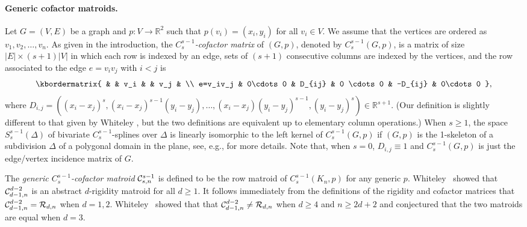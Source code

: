 \documentclass{daj}
\newcommand{\R}{\mathbb{R}}
\begin{document}
\paragraph{Generic cofactor matroids.}%
Let $G=(V,E)$ be a graph and $p:V\to \R^2$ such that $p(v_i)=(x_i,y_i)$ for all $v_i\in V$.
We assume that  the vertices are ordered as $v_1,v_2,\ldots,v_n$.
As given in the introduction,
the {\em $C^{s-1}_s$-cofactor matrix} of $(G,p)$, denoted by $C_s^{s-1}(G,p)$, is a matrix of size
$|E|\times (s+1)|V|$  in which each row is indexed by an edge, sets of $(s+1)$ consecutive columns are indexed by the vertices,
and the row associated to the  edge $e=v_iv_j$ with $i<j$ is
\[
\kbordermatrix{
 & & v_i & & v_j & \\
 e=v_iv_j & 0\cdots 0 & D_{ij} & 0 \cdots 0 & -D_{ij} & 0\cdots 0
},
\]
where  $D_{i,j}=((x_i-x_j)^s, (x_i-x_j)^{s-1}(y_i-y_j),\dots, (x_i-x_j)(y_i-y_j)^{s-1}, (y_i-y_j)^s)\in \mathbb{R}^{s+1}$.
(Our definition is slightly different to that given by Whiteley \cite{Wsurvey}, but the two definitions are equivalent up to elementary column operations.)
When $s\geq 1$, the space $S_s^{s-1}(\Delta)$ of bivariate $C_s^{s-1}$-splines over $\Delta$ is linearly isomorphic to the left kernel of  $C_s^{s-1}(G,p)$ if $(G,p)$ is the 1-skeleton of a subdivision $\Delta$ of a polygonal domain in the plane,
see, e.g., \cite{Wsurvey} for more details. Note that, when $s=0$, $D_{i,j}\equiv 1$ and $C_s^{s-1}(G,p)$ is just the edge/vertex incidence matrix of $G$. 

The {\em generic $C_s^{s-1}$-cofactor matroid} ${\cal C}_{s,n}^{s-1}$ is defined to be the row matroid of $C_s^{s-1}(K_n,p)$ for any generic $p$. Whiteley~\cite{Wsurvey} showed that  ${\cal C}_{d-1,n}^{d-2}$ is an abstract $d$-rigidity matroid for all $d\geq 1$. It follows immediately from the definitions of the rigidity and cofactor matrices  that ${\cal C}_{d-1,n}^{d-2}={\cal R}_{d,n}$ when $d=1,2$.  Whiteley~\cite{Wsurvey} showed that that ${\cal C}_{d-1,n}^{d-2}\neq{\cal R}_{d,n}$ when $d\geq 4$ and $n\geq 2d+2$ and conjectured that the two matroids are equal when $d=3$.
\end{document}
